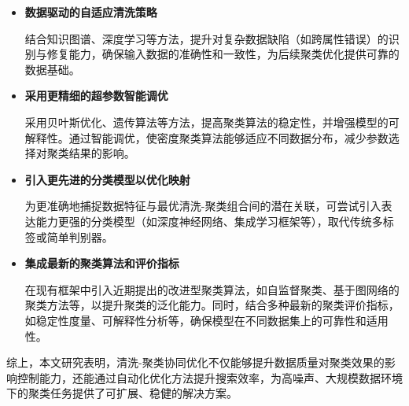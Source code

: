 \documentclass[10pt]{article} %
\numberwithin{equation}{section}
\begin{document}
\begin{itemize}
    \item \textbf{数据驱动的自适应清洗策略} 
 
    结合知识图谱、深度学习等方法，提升对复杂数据缺陷（如跨属性错误）的识别与修复能力，确保输入数据的准确性和一致性，为后续聚类优化提供可靠的数据基础。

    \item \textbf{采用更精细的超参数智能调优}  

    采用贝叶斯优化、遗传算法等方法，提高聚类算法的稳定性，并增强模型的可解释性。通过智能调优，使密度聚类算法能够适应不同数据分布，减少参数选择对聚类结果的影响。

    \item \textbf{引入更先进的分类模型以优化映射}  

    为更准确地捕捉数据特征与最优清洗-聚类组合间的潜在关联，可尝试引入表达能力更强的分类模型（如深度神经网络、集成学习框架等），取代传统多标签或简单判别器。

    \item \textbf{集成最新的聚类算法和评价指标}  

    在现有框架中引入近期提出的改进型聚类算法，如自监督聚类、基于图网络的聚类方法等，以提升聚类的泛化能力。同时，结合多种最新的聚类评价指标，如稳定性度量、可解释性分析等，确保模型在不同数据集上的可靠性和适用性。
\end{itemize}

综上，本文研究表明，清洗-聚类协同优化不仅能够提升数据质量对聚类效果的影响控制能力，还能通过自动化优化方法提升搜索效率，为高噪声、大规模数据环境下的聚类任务提供了可扩展、稳健的解决方案。

\begingroup
\footnotesize %

    
\endgroup
\end{document}
